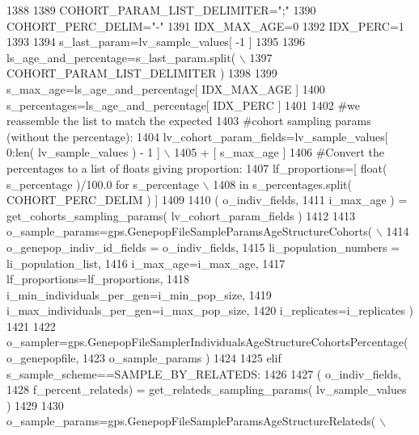 \begin{DoxyCode}
1388         
1389         COHORT\_PARAM\_LIST\_DELIMITER=\textcolor{stringliteral}{";"}
1390         COHORT\_PERC\_DELIM=\textcolor{stringliteral}{"-"}
1391         IDX\_MAX\_AGE=0
1392         IDX\_PERC=1
1393 
1394         s\_last\_param=lv\_sample\_values[ -1 ]
1395 
1396         ls\_age\_and\_percentage=s\_last\_param.split( \(\backslash\)
1397                         COHORT\_PARAM\_LIST\_DELIMITER )
1398 
1399         s\_max\_age=ls\_age\_and\_percentage[ IDX\_MAX\_AGE ]
1400         s\_percentages=ls\_age\_and\_percentage[ IDX\_PERC ]
1401         
1402         \textcolor{comment}{#we reassemble the list to match the expected}
1403         \textcolor{comment}{#cohort sampling params (without the percentage):}
1404         lv\_cohort\_param\_fields=lv\_sample\_values[ 0:len( lv\_sample\_values ) - 1 ] \(\backslash\)
1405                                                             + [ s\_max\_age ]     
1406         \textcolor{comment}{#Convert the percentages to a list of floats giving proportion:}
1407         lf\_proportions=[ float( s\_percentage )/100.0 \textcolor{keywordflow}{for} s\_percentage  \(\backslash\)
1408                             \textcolor{keywordflow}{in} s\_percentages.split( COHORT\_PERC\_DELIM ) ]
1409 
1410         ( o\_indiv\_fields,
1411                 i\_max\_age ) = get\_cohorts\_sampling\_params( lv\_cohort\_param\_fields )
1412 
1413         o\_sample\_params=gps.GenepopFileSampleParamsAgeStructureCohorts( \(\backslash\)
1414                                             o\_genepop\_indiv\_id\_fields = o\_indiv\_fields,
1415                                             li\_population\_numbers = li\_population\_list,
1416                                             i\_max\_age=i\_max\_age,
1417                                             lf\_proportions=lf\_proportions,
1418                                             i\_min\_individuals\_per\_gen=i\_min\_pop\_size,
1419                                             i\_max\_individuals\_per\_gen=i\_max\_pop\_size,
1420                                             i\_replicates=i\_replicates )
1421 
1422         o\_sampler=gps.GenepopFileSamplerIndividualsAgeStructureCohortsPercentage( o\_genepopfile,
1423                                                                                     o\_sample\_params )
1424                                 
1425     \textcolor{keywordflow}{elif} s\_sample\_scheme==SAMPLE\_BY\_RELATEDS:
1426 
1427             ( o\_indiv\_fields,
1428                 f\_percent\_relateds) = get\_relateds\_sampling\_params( lv\_sample\_values )
1429 
1430             o\_sample\_params=gps.GenepopFileSampleParamsAgeStructureRelateds( \(\backslash\)

\end{DoxyCode}
